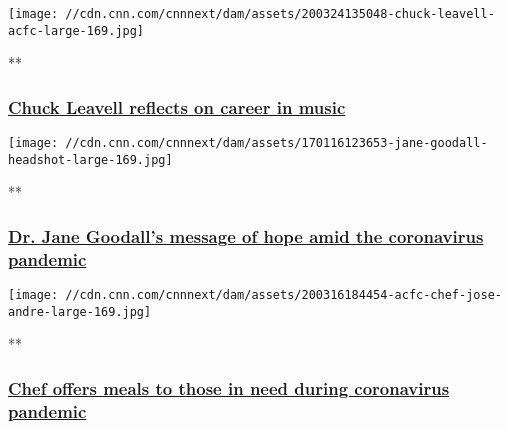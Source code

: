 \href{/videos/us/2020/03/24/chuck-leavell-acfc-full-episode-vpx.cnn/video/playlists/acfc-full-episodes/}{}

\texttt{[image: //cdn.cnn.com/cnnnext/dam/assets/200324135048-chuck-leavell-acfc-large-169.jpg]}

**

\hypertarget{chuck-leavell-reflects-on-career-in-music}{%
\subsubsection{\texorpdfstring{\href{/videos/us/2020/03/24/chuck-leavell-acfc-full-episode-vpx.cnn/video/playlists/acfc-full-episodes/}{Chuck
Leavell reflects on career in
music}}{Chuck Leavell reflects on career in music}}\label{chuck-leavell-reflects-on-career-in-music}}

\href{/videos/us/2020/03/19/coronavirus-jane-goodall-acfc-full-episode-vpx.cnn/video/playlists/acfc-full-episodes/}{}

\texttt{[image: //cdn.cnn.com/cnnnext/dam/assets/170116123653-jane-goodall-headshot-large-169.jpg]}

**

\hypertarget{dr-jane-goodalls-message-of-hope-amid-the-coronavirus-pandemic}{%
\subsubsection{\texorpdfstring{\href{/videos/us/2020/03/19/coronavirus-jane-goodall-acfc-full-episode-vpx.cnn/video/playlists/acfc-full-episodes/}{Dr.
Jane Goodall's message of hope amid the coronavirus
pandemic}}{Dr. Jane Goodall's message of hope amid the coronavirus pandemic}}\label{dr-jane-goodalls-message-of-hope-amid-the-coronavirus-pandemic}}

\href{/videos/us/2020/03/16/chef-helps-feed-community-during-coronavirus-pandemic-acfc-full-episode-vpx.cnn/video/playlists/acfc-full-episodes/}{}

\texttt{[image: //cdn.cnn.com/cnnnext/dam/assets/200316184454-acfc-chef-jose-andre-large-169.jpg]}

**

\hypertarget{chef-offers-meals-to-those-in-need-during-coronavirus-pandemic}{%
\subsubsection{\texorpdfstring{\href{/videos/us/2020/03/16/chef-helps-feed-community-during-coronavirus-pandemic-acfc-full-episode-vpx.cnn/video/playlists/acfc-full-episodes/}{Chef
offers meals to those in need during coronavirus
pandemic}}{Chef offers meals to those in need during coronavirus pandemic}}\label{chef-offers-meals-to-those-in-need-during-coronavirus-pandemic}}

